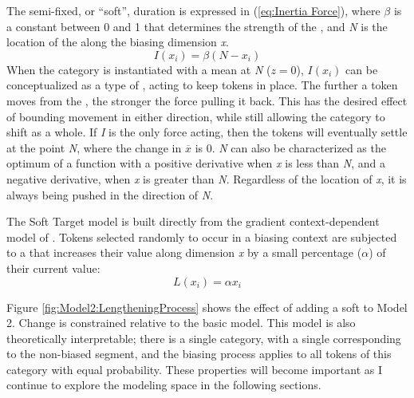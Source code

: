 The semi-fixed, or “soft”, duration  is expressed in (\ref{eq:Inertia Force}),
where $\beta$ is a constant between 0 and 1 that determines the strength
of the , and \emph{N} is the location of the  along the
biasing dimension \emph{x}.
\begin{equation}
I(x_{i})=\beta(N-x_{i})\label{eq:Inertia Force}
\end{equation}
When the category is instantiated with a mean at \emph{N} ($z=0$),
$I(x_{i})$ can be conceptualized as a type of , acting to keep
tokens in place. The further a token moves from the , the stronger
the force pulling it back. This has the desired effect of bounding
movement in either direction, while still allowing the category to
shift as a whole. If \emph{I} is the only force acting, then the tokens
will eventually settle at the  point \emph{N}, where the
change in \emph{$\overline{x}$} is 0. \emph{N} can also be characterized
as the optimum of a function with a positive derivative when \emph{x}
is less than \emph{N}, and a negative derivative, when \emph{x} is
greater than \emph{N}. Regardless of the location of \emph{x}, it
is always being pushed in the direction of \emph{N}. 

The Soft Target model is built directly from the gradient context-dependent
model of . Tokens selected
randomly to occur in a biasing context are subjected to a  that
increases their value along dimension \emph{x} by a small percentage
($\alpha$) of their current value: 
\begin{equation}
L(x_{i})=\alpha x_{i}\label{eq:Lengthening Force}
\end{equation}

Figure \ref{fig:Model2:LengtheningProcess} shows the effect of adding
a soft  to Model 2. Change is constrained relative to the basic
model. This model is also theoretically interpretable; there is a
single category, with a single   corresponding to
the non-biased segment, and the biasing process applies to all tokens
of this category with equal probability. These properties will become
important as I continue to explore the modeling space in the following
sections. 

